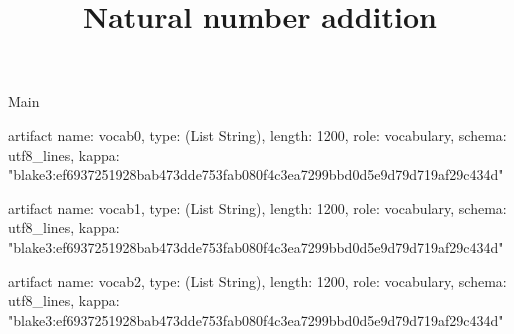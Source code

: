 \begin{lexlean}{Main}
\title{Natural number addition}
\begin{semanticmodule}
artifact{
  name: vocab0,
  type: (List String),
  length: 1200,
  role: vocabulary,
  schema: utf8_lines{},
  kappa: "blake3:ef6937251928bab473dde753fab080f4c3ea7299bbd0d5e9d79d719af29c434d"
}

artifact{
  name: vocab1,
  type: (List String),
  length: 1200,
  role: vocabulary,
  schema: utf8_lines{},
  kappa: "blake3:ef6937251928bab473dde753fab080f4c3ea7299bbd0d5e9d79d719af29c434d"
}

artifact{
  name: vocab2,
  type: (List String),
  length: 1200,
  role: vocabulary,
  schema: utf8_lines{},
  kappa: "blake3:ef6937251928bab473dde753fab080f4c3ea7299bbd0d5e9d79d719af29c434d"
}
\end{semanticmodule}
\end{lexlean}
